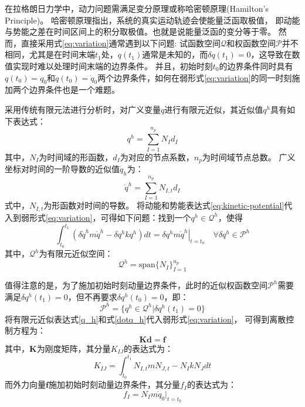 在拉格朗日力学中，动力问题需满足变分原理或称哈密顿原理(Hamilton's Principle)。
哈密顿原理指出，系统的真实运动轨迹会使能量泛函取极值，
即动能与势能之差在时间区间上的积分取极值。也就是说能量泛函的变分等于零。
然而，直接采用式\eqref{eq:variation}通常遇到以下问题:
试函数空间$\mathcal{Q}$和权函数空间$\mathcal{P}$并不相同，尤其是在时间末端$t_1$处，$q(t_1)$通常是未知的，而$\delta q(t_1)=0$，这导致在数值实现时难以处理时间末端的边界条件。
并且，初始时刻$t_0$的边界条件同时具有$q(t_0)=q_0$和$\dot q(t_0)=\dot q_0$两个边界条件，如何在弱形式\eqref{eq:variation}的同一时刻施加两个边界条件也是一个难题。

采用传统有限元法进行分析时，对广义变量$q$进行有限元近似，其近似值$q^h$具有如下表达式：
\begin{equation}\label{q_h}
q^h = \sum_{I=1}^{n_p} N_I d_I
\end{equation}
其中，$N_I$为时间域的形函数，$d_I$为对应的节点系数，$n_p$为时间域节点总数。
广义坐标对时间的一阶导数的近似值$\dot q_h$为：
\begin{equation}\label{dotq_h}
    \dot q^h = \sum_{I=1}^{n_p} N_{I,t} d_I
\end{equation}
式中，$N_{I,t}$为形函数对时间的导数。
将动能和势能表达式\eqref{eq:kinetic-potential}代入到弱形式\eqref{eq:variation}，可得如下问题：找到一个$q^h\in \mathcal{Q}^h$，使得
\begin{equation}\label{eq:discrete-variation}
    \int_{t_0}^{t_1} \left( \delta \dot q^h m \dot q^h - \delta q^h k q^h \right) dt = \left. \delta q^h m \dot q^h \right|_{t=t_0} \quad \forall \delta q^h \in \mathcal{P}^h
\end{equation}
其中，$\mathcal Q^h$为有限元近似空间：
\begin{equation}
    \mathcal Q^h = \textrm{span} \{N_I\}_{I=1}^{n_p}
\end{equation}

值得注意的是，为了施加初始时刻动量边界条件，此时的近似权函数空间$\mathcal{P}^h$需要满足$\delta q^h(t_1)=0$，但不再要求$\delta q^h(t_0)=0$，即：
\begin{equation}
    \mathcal P^h = \{q^h \in \mathcal Q^h \vert \delta q^h(t_1) = 0\}
\end{equation}
将有限元近似表达式\eqref{q_h}和式\eqref{dotq_h}代入弱形式\eqref{eq:variation}，
可得到离散控制方程为：
\begin{equation}\label{2.15}
\boldsymbol K \boldsymbol d = \boldsymbol f
\end{equation}
其中，$\boldsymbol K$为刚度矩阵，其分量$K_{IJ}$的表达式为：
\begin{equation}\label{K_IJ}
K_{IJ} = \int_{t_0}^{t_1} N_{I,t} m N_{J,t} - N_I k N_J dt
\end{equation}
而外力向量$\boldsymbol f$施加初始时刻动量边界条件，其分量$f_I$的表达式为：
\begin{equation}\label{f_I}
    f_I = N_I m \dot q_0 |_{t=t_0}
\end{equation}

